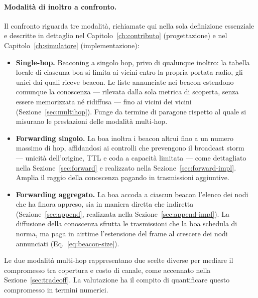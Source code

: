 \paragraph{Modalit\`a di inoltro a confronto.} Il confronto riguarda tre
modalit\`a, richiamate qui nella sola definizione essenziale e descritte in
dettaglio nel Capitolo~\ref{ch:contributo} (progettazione) e nel
Capitolo~\ref{ch:simulatore} (implementazione):
\begin{itemize}[leftmargin=1.4em,nosep]
  \item \textbf{Single-hop.} Beaconing a singolo hop, privo di
  qualunque inoltro: la tabella locale di ciascuna boa si limita ai vicini entro la propria portata radio,
  gli unici dai quali riceve beacon. Le liste annunciate nei beacon estendono
  comunque la conoscenza --- rilevata dalla sola metrica di scoperta, senza essere
  memorizzata n\'e ridiffusa --- fino ai vicini dei vicini (Sezione~\ref{sec:multihop}).
  Funge da termine di paragone rispetto al quale
  si misurano le prestazioni delle modalit\`a multi-hop.
  \item \textbf{Forwarding singolo.} La boa inoltra i beacon altrui fino a un
  numero massimo di hop, affidandosi ai controlli che prevengono il broadcast storm~\cite{broadcaststorm} --- unicit\`a dell'origine, TTL e coda a capacit\`a limitata --- come
  dettagliato nella Sezione~\ref{sec:forward} e realizzato nella
  Sezione~\ref{sec:forward-impl}. Amplia il raggio della conoscenza pagando in trasmissioni aggiuntive.
  \item \textbf{Forwarding aggregato.} La boa accoda a ciascun beacon 
  l'elenco dei nodi che ha finora appreso, sia in maniera diretta che indiretta (Sezione~\ref{sec:append}, realizzata nella Sezione~\ref{sec:append-impl}).
  La diffusione della conoscenza sfrutta le trasmissioni che la boa schedula di norma, ma
  paga in airtime l'estensione del frame al crescere dei nodi annunciati (Eq.~\ref{eq:beacon-size}).
\end{itemize}
Le due modalit\`a multi-hop rappresentano due scelte diverse per mediare il compromesso tra
copertura e costo di canale, come accennato nella Sezione~\ref{sec:tradeoff}. 
La valutazione ha il compito di quantificare questo compromesso in termini numerici.

